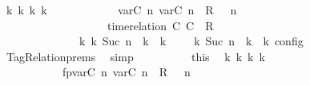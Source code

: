 \begin{isabellebody}
\ {\isacartoucheopen}{\isasymexists}{\isasymGamma}\isactrlsub k\ {\isasymPsi}\isactrlsub k\ {\isasymPhi}\isactrlsub k\ k{\isachardot}\isanewline
\ \ \ \ \ \ \ \ \ \ \ \ {\isacharparenleft}{\isacharparenleft}{\isacharparenleft}{\isacharparenleft}{\isasymlfloor}{\isasymtau}\isactrlsub v\isactrlsub a\isactrlsub r{\isacharparenleft}C\ n{\isacharparenright}{\isacharcomma}\ {\isasymtau}\isactrlsub v\isactrlsub a\isactrlsub r{\isacharparenleft}C\ n{\isacharparenright}{\isasymrfloor}\ {\isasymin}\ R{\isacharparenright}\ {\isacharhash}\ {\isasymGamma}{\isacharparenright}{\isacharcomma}\ n\isanewline
\ \ \ \ \ \ \ \ \ \ \ \ \ \ \ \ {\isasymturnstile}\ {\isasymPsi}\ {\isasymtriangleright}\ {\isacharparenleft}{\isacharparenleft}time{\isacharminus}relation\ {\isasymlfloor}C\ C\ {\isasymin}\ R{\isacharparenright}\ {\isacharhash}\ {\isasymPhi}{\isacharparenright}{\isacharparenright}\isanewline
\ \ \ \ \ \ \ \ \ \ \ \ \ \ {\isasymhookrightarrow}\isactrlbsup k\isactrlesup \ {\isacharparenleft}{\isasymGamma}\isactrlsub k{\isacharcomma}\ Suc\ n\ {\isasymturnstile}\ {\isasymPsi}\isactrlsub k\ {\isasymtriangleright}\ {\isasymPhi}\isactrlsub k{\isacharparenright}{\isacharparenright}\ {\isasymand}\ {\isasymrho}\ {\isasymin}\ {\isasymlbrakk}\ {\isasymGamma}\isactrlsub k{\isacharcomma}\ Suc\ n\ {\isasymturnstile}\ {\isasymPsi}\isactrlsub k\ {\isasymtriangleright}\ {\isasymPhi}\isactrlsub k\ {\isasymrbrakk}\isactrlsub c\isactrlsub o\isactrlsub n\isactrlsub f\isactrlsub i\isactrlsub g{\isacartoucheclose}\isanewline
\ \ \ \ \ \ \ \ \ \ \isamarkupfalse%
\ TagRelation{\isachardot}prems\ \isamarkupfalse%
\ simp\isanewline
\isanewline
\ \ \ \ \ \ \ \ \isamarkupfalse%
\ this\ \isamarkupfalse%
\ {\isasymGamma}\isactrlsub k\ {\isasymPsi}\isactrlsub k\ {\isasymPhi}\isactrlsub k\ k\isanewline
\ \ \ \ \ \ \ \ \ \ \ fp{\isacharcolon}{\isacartoucheopen}{\isacharparenleft}{\isacharparenleft}{\isacharparenleft}{\isacharparenleft}{\isasymlfloor}{\isasymtau}\isactrlsub v\isactrlsub a\isactrlsub r{\isacharparenleft}C\ n{\isacharparenright}{\isacharcomma}\ {\isasymtau}\isactrlsub v\isactrlsub a\isactrlsub r{\isacharparenleft}C\ n{\isacharparenright}{\isasymrfloor}\ {\isasymin}\ R{\isacharparenright}\ {\isacharhash}\ {\isasymGamma}{\isacharparenright}{\isacharcomma}\ n\isanewline

\end{isabellebody}
